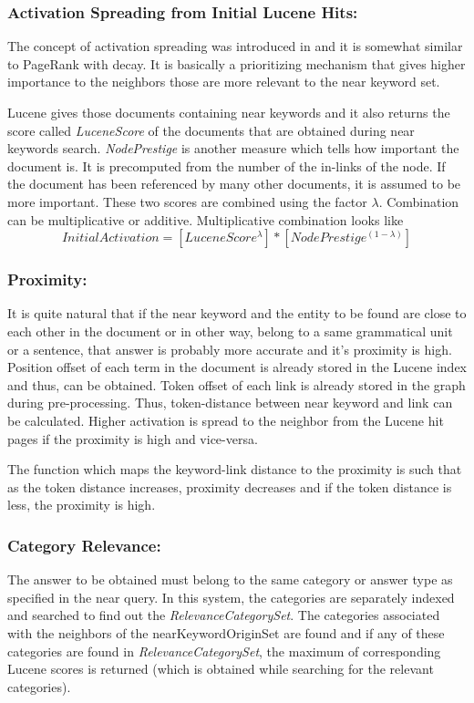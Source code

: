 \documentclass[11pt]{report}
\begin{document}
\subsubsection*{Activation Spreading from Initial Lucene Hits:}
The concept of activation spreading was introduced in \cite{kacholia} and it is somewhat similar to PageRank with decay. It is basically a prioritizing mechanism that
gives higher importance to the neighbors those are more relevant to the near keyword set.
 
Lucene gives those documents containing near keywords and it also returns the score called \textit{LuceneScore} of the documents that are obtained during near keywords
search. \textit{NodePrestige} is another measure which tells how important the document is. It is precomputed from the number of the in-links of the
node. If the document has been referenced by many other documents, it is assumed to be more important. These two scores are combined using the factor $\lambda$. Combination
can be multiplicative or additive. Multiplicative combination looks like
\begin{equation}
 InitialActivation = [LuceneScore ^ \lambda] * [NodePrestige ^ {(1 - \lambda)}]
\end{equation}

\subsubsection*{Proximity:}
It is quite natural that if the near keyword and the entity to be found are close to each other in the document or in other way, belong to a same grammatical
unit or a sentence, that answer is probably more accurate and it's proximity is high. Position offset of each term in the document is already stored in the Lucene
index and thus, can be obtained. Token offset of each link is already stored in the graph during pre-processing. Thus, token-distance between near keyword and link
can be calculated. Higher activation is spread to the neighbor from the Lucene hit pages if the proximity is high and vice-versa.

The function which maps the keyword-link distance to the proximity is such that as the token distance increases, proximity decreases and if the token distance is
less, the proximity is high.

\subsubsection*{Category Relevance:}
The answer to be obtained must belong to the same category or answer type as specified in the near query. In this system, the categories are separately
indexed and searched to find out the \textit{RelevanceCategorySet}. The categories associated with the neighbors of the nearKeywordOriginSet are found and if any of 
these categories are found in \textit{RelevanceCategorySet}, the maximum of corresponding Lucene scores is returned (which is obtained while searching for the 
relevant categories).
\end{document}
